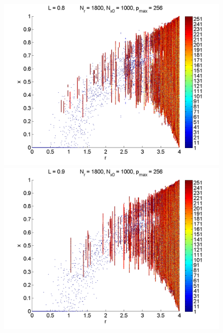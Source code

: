 \begin{figure}[H]
\begin{center}
		\includegraphics[width=.5\textwidth]{figs/rlog_bif_L_08.png}\hfill
		\includegraphics[width=.5\textwidth]{figs/rlog_bif_L_09.png}\\
	\end{center}
\end{figure}

